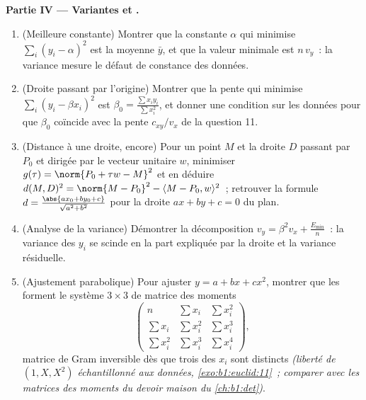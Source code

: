 \begin{problem}
\medskip
\noindent\textbf{Partie IV --- Variantes et .}
\begin{enumerate}[resume]
  \item (Meilleure constante) Montrer que la constante $\alpha$
        qui minimise $\sum_i (y_i - \alpha)^2$ est la moyenne
        $\bar y$, et que la valeur minimale est $n\,v_y$~: la
        variance mesure le défaut de constance des données.
  \item (Droite passant par l'origine) Montrer que la pente qui
        minimise $\sum_i (y_i - \beta x_i)^2$ est $\beta_0 =
        \frac{\sum x_iy_i}{\sum x_i^2}$, et donner une condition
        sur les données pour que $\beta_0$ coïncide avec la pente
        $c_{xy}/v_x$ de la question 11.
  \item (Distance à une droite, encore) Pour un point $M$ et la
        droite $D$ passant par $P_0$ et dirigée par le vecteur
        unitaire $w$, minimiser $g(\tau) = \norm{P_0 + \tau w -
        M}^2$ et en déduire $d(M, D)^2 = \norm{M - P_0}^2 -
        \langle M - P_0, w\rangle^2$~; retrouver la formule $d =
        \frac{\abs{a x_0 + b y_0 + c}}{\sqrt{a^2 + b^2}}$ pour la
        droite $ax + by + c = 0$ du plan.
  \item (Analyse de la variance) Démontrer la décomposition $v_y =
        \beta^2 v_x + \frac{E_{\min}}n$~: la variance des $y_i$ se
        scinde en la part expliquée par la droite et la variance
        résiduelle.
  \item (Ajustement parabolique) Pour ajuster $y = a + bx + cx^2$,
        montrer que les  forment le système $3
        \times 3$ de matrice des moments
        \[
        \begin{pmatrix}
        n & \sum x_i & \sum x_i^2\\
        \sum x_i & \sum x_i^2 & \sum x_i^3\\
        \sum x_i^2 & \sum x_i^3 & \sum x_i^4
        \end{pmatrix},
        \]
        matrice de Gram inversible dès que trois des $x_i$ sont
        distincts \emph{(liberté de $(1, X, X^2)$ échantillonné
        aux données, \cref{exo:b1:euclid:11}~; comparer avec les
        matrices des moments du devoir maison du
        \cref{ch:b1:det})}.
\end{enumerate}


\end{problem}
